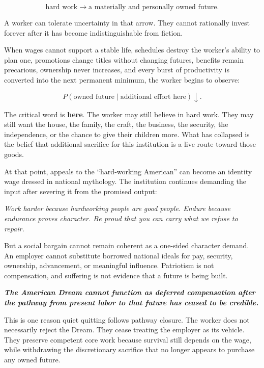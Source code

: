 \documentclass[11pt,oneside]{article}
\renewenvironment{quote}
  {\begin{tcolorbox}[
      enhanced,
      breakable,
      colback=ManifestLight,
      colframe=ManifestRule,
      boxrule=0pt,
      leftrule=3pt,
      arc=0pt,
      outer arc=0pt,
      left=10pt,right=10pt,top=8pt,bottom=8pt,
      before skip=0.8em,after skip=0.8em
    ]\itshape}
  {\end{tcolorbox}}
\begin{document}
\[
\text{hard work}
\longrightarrow
\text{a materially and personally owned future}.
\]

A worker can tolerate uncertainty in that arrow. They cannot rationally
invest forever after it has become indistinguishable from fiction.

When wages cannot support a stable life, schedules destroy the worker's
ability to plan one, promotions change titles without changing futures,
benefits remain precarious, ownership never increases, and every burst
of productivity is converted into the next permanent minimum, the
worker begins to observe:

\[
P(\text{owned future}\mid\text{additional effort here})\downarrow.
\]

The critical word is \textbf{here}. The worker may still believe in hard
work. They may still want the house, the family, the craft, the business,
the security, the independence, or the chance to give their children
more. What has collapsed is the belief that additional sacrifice for
this institution is a live route toward those goods.

At that point, appeals to the ``hard-working American'' can become an
identity wage dressed in national mythology. The institution continues
demanding the input after severing it from the promised output:

\begin{quote}
Work harder because hardworking people are good people. Endure because
endurance proves character. Be proud that you can carry what we refuse
to repair.
\end{quote}

But a social bargain cannot remain coherent as a one-sided character
demand. An employer cannot substitute borrowed national ideals for pay,
security, ownership, advancement, or meaningful influence. Patriotism
is not compensation, and suffering is not evidence that a future is
being built.

\begin{quote}
\textbf{The American Dream cannot function as deferred compensation after
the pathway from present labor to that future has ceased to be
credible.}
\end{quote}

This is one reason quiet quitting follows pathway closure. The worker
does not necessarily reject the Dream. They cease treating the employer
as its vehicle. They preserve competent core work because survival still
depends on the wage, while withdrawing the discretionary sacrifice that
no longer appears to purchase any owned future.
\end{document}
